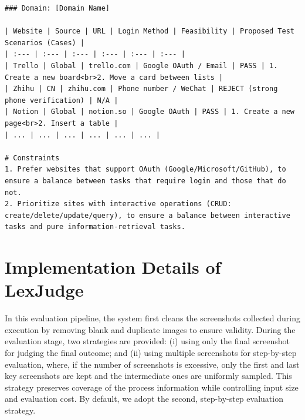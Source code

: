 \begin{tcolorbox}[
  title={Planning Prompt},
  colback=white,
  colframe=tableblueTitle,
  colbacktitle=tableblueTitle,
  coltitle=white,
  fonttitle=\bfseries,
  breakable,
  enhanced,
  boxrule=1.2pt,
  arc=1.5mm
]
\begin{lstlisting}
### Domain: [Domain Name]

| Website | Source | URL | Login Method | Feasibility | Proposed Test Scenarios (Cases) |
| :--- | :--- | :--- | :--- | :--- | :--- |
| Trello | Global | trello.com | Google OAuth / Email | PASS | 1. Create a new board<br>2. Move a card between lists |
| Zhihu | CN | zhihu.com | Phone number / WeChat | REJECT (strong phone verification) | N/A |
| Notion | Global | notion.so | Google OAuth | PASS | 1. Create a new page<br>2. Insert a table |
| ... | ... | ... | ... | ... | ... |

# Constraints
1. Prefer websites that support OAuth (Google/Microsoft/GitHub), to ensure a balance between tasks that require login and those that do not.
2. Prioritize sites with interactive operations (CRUD: create/delete/update/query), to ensure a balance between interactive tasks and pure information-retrieval tasks.

\end{lstlisting}
\end{tcolorbox}

\clearpage
\section{Implementation Details of LexJudge}
\label{app:implementation-details-lexjudge}
In this evaluation pipeline, the system first cleans the screenshots collected during execution by removing blank and duplicate images to ensure validity. During the evaluation stage, two strategies are provided: (i) using only the final screenshot for judging the final outcome; and (ii) using multiple screenshots for step-by-step evaluation, where, if the number of screenshots is excessive, only the first and last key screenshots are kept and the intermediate ones are uniformly sampled. This strategy preserves coverage of the process information while controlling input size and evaluation cost. By default, we adopt the second, step-by-step evaluation strategy.

